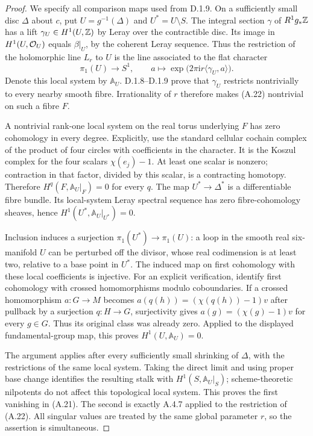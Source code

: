 \begin{proof}
We specify all comparison maps used from D.1.9. On a sufficiently small disc $\Delta$ about $c$, put $U=g^{-1}(\Delta)$ and $U^*=U\setminus S$. The integral section $\gamma$ of $R^1g_*\mathbb Z$ has a lift $\gamma_U\in H^1(U,\mathbb Z)$ by Leray over the contractible disc. Its image in $H^1(U,\mathcal O_U)$ equals $\beta|_U$, by the coherent Leray sequence. Thus the restriction of the holomorphic line $L_r$ to $U$ is the line associated to the flat character
\[
 \pi_1(U)\longrightarrow S^1,\qquad
 a\longmapsto\exp\bigl(2\pi\mathrm i r\langle\gamma_U,a\rangle\bigr).
 \tag{A.22}
\]
Denote this local system by $\mathbb A_U$. D.1.8--D.1.9 prove that $\gamma_U$ restricts nontrivially to every nearby smooth fibre. Irrationality of $r$ therefore makes (A.22) nontrivial on such a fibre $F$.

A nontrivial rank-one local system on the real torus underlying $F$ has zero cohomology in every degree. Explicitly, use the standard cellular cochain complex of the product of four circles with coefficients in the character. It is the Koszul complex for the four scalars $\chi(e_j)-1$. At least one scalar is nonzero; contraction in that factor, divided by this scalar, is a contracting homotopy. Therefore $H^q(F,\mathbb A_U|_F)=0$ for every $q$. The map $U^*\to\Delta^*$ is a differentiable fibre bundle. Its local-system Leray spectral sequence has zero fibre-cohomology sheaves, hence
$H^1(U^*,\mathbb A_U|_{U^*})=0$.

Inclusion induces a surjection $\pi_1(U^*)\to\pi_1(U)$: a loop in the smooth real six-manifold $U$ can be perturbed off the divisor, whose real codimension is at least two, relative to a base point in $U^*$. The induced map on first cohomology with these local coefficients is injective. For an explicit verification, identify first cohomology with crossed homomorphisms modulo coboundaries. If a crossed homomorphism $a:G\to M$ becomes $a(q(h))=(\chi(q(h))-1)v$ after pullback by a surjection $q:H\to G$, surjectivity gives $a(g)=(\chi(g)-1)v$ for every $g\in G$. Thus its original class was already zero. Applied to the displayed fundamental-group map, this proves $H^1(U,\mathbb A_U)=0$.

The argument applies after every sufficiently small shrinking of $\Delta$, with the restrictions of the same local system. Taking the direct limit and using proper base change identifies the resulting stalk with $H^1(S,\mathbb A_U|_S)$; scheme-theoretic nilpotents do not affect this topological local system. This proves the first vanishing in (A.21). The second is exactly A.4.7 applied to the restriction of (A.22). All singular values are treated by the same global parameter $r$, so the assertion is simultaneous.
\end{proof}


